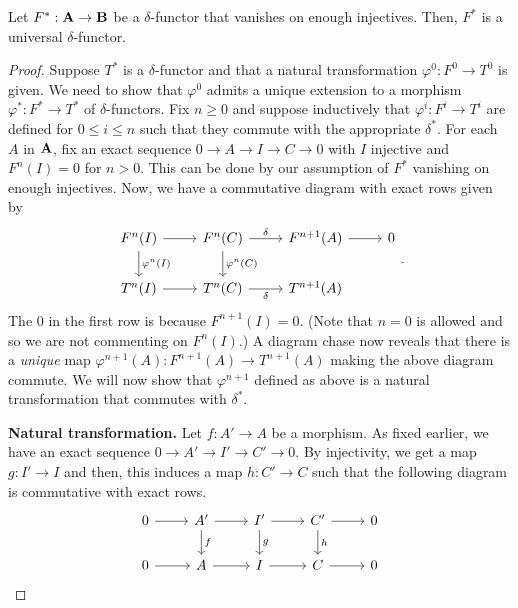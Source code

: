 \documentclass[12pt]{article}
\begin{document}
\begin{prop}
	Let $F^{\ast} : \mathbf{A} \to \mathbf{B}$ be a $\delta$-functor that vanishes on enough injectives. Then, $F^{\ast}$ is a universal $\delta$-functor.
\end{prop}
\begin{proof} 
	Suppose $T^{\ast}$ is a $\delta$-functor and that a natural transformation $\varphi^{0} : F^{0} \to T^{0}$ is given. We need to show that $\varphi^{0}$ admits a unique extension to a morphism $\varphi^{\ast} : F^{\ast} \to T^{\ast}$ of $\delta$-functors. Fix $n \ge 0$ and suppose inductively that $\varphi^{i} : F^{i} \to T^{i}$ are defined for $0 \le i \le n$ such that they commute with the appropriate $\delta^{\ast}$. For each $A$ in $\mathbf{A}$, fix an exact sequence $0 \to A \to I \to C \to 0$ with $I$ injective and $F^{n}(I) = 0$ for $n > 0$. This can be done by our assumption of $F^{\ast}$ vanishing on enough injectives. Now, we have a commutative diagram with exact rows given by
	\begin{equation} \label{eq:08}
		\begin{tikzcd}
			F^{n}(I) \arrow[d, "\varphi^{n}(I)"] \arrow[r] & F^{n}(C) \arrow[d, "\varphi^{n}(C)"] \arrow[r, "\delta"] & F^{n + 1}(A) \arrow[r] & 0 \\
			T^{n}(I) \arrow[r] & T^{n}(C) \arrow[r, "\delta"'] & T^{n + 1}(A) & 
		\end{tikzcd}.
	\end{equation}
	The $0$ in the first row is because $F^{n + 1}(I) = 0$. (Note that $n = 0$ is allowed and so we are not commenting on $F^{n}(I)$.) A diagram chase now reveals that there is a \emph{unique} map $\varphi^{n + 1}(A) : F^{n + 1}(A) \to T^{n + 1}(A)$ making the above diagram commute. We will now show that $\varphi^{n + 1}$ defined as above is a natural transformation that commutes with $\delta^{\ast}$.

	\textbf{Natural transformation.} Let $f : A' \to A$ be a morphism. As fixed earlier, we have an exact sequence $0 \to A' \to I' \to C' \to 0$. By injectivity, we get a map $g : I' \to I$ and then, this induces a map $h : C' \to C$ such that the following diagram is commutative with exact rows. 
	\begin{equation} \label{eq:05}
		\begin{tikzcd}
			0 \arrow[r] & A' \arrow[r] \arrow[d, "f"] & I' \arrow[r] \arrow[d, "g"] & C' \arrow[r] \arrow[d, "h"] & 0 \\
			0 \arrow[r] & A \arrow[r] & I \arrow[r] & C \arrow[r] & 0 
		\end{tikzcd}
	\end{equation}


\end{proof}
\end{document}

